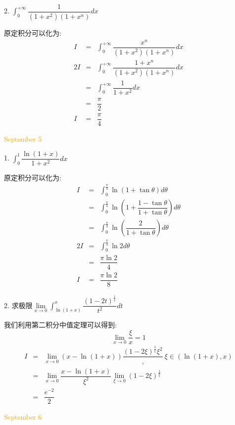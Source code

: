 2. $\int_{0}^{+\infty}\dfrac{1}{(1+x^2)(1+x^n)}dx$
\begin{solution}

	原定积分可以化为:  
	\begin{eqnarray*}
		I&=&\int_{0}^{+\infty}\dfrac{x^n}{(1+x^2)(1+x^n)}dx\\
		2I&=&\int_{0}^{+\infty}\dfrac{1+x^n}{(1+x^2)(1+x^n)}dx\\
		&=&\int_{0}^{+\infty}\dfrac{1}{1+x^2}dx\\
		&=&\dfrac{\pi}{2}\\
		I&=&\dfrac{\pi}{4}
	\end{eqnarray*}
\end{solution}

\textcolor{orange}{September 5}

1. $\int_{0}^{1}\dfrac{\ln(1+x)}{1+x^2}dx$
\begin{solution}

	原定积分可以化为:  
	\begin{eqnarray*}
		I&=&\int_{0}^{\frac{\pi}{4}}\ln(1+\tan \theta)d\theta\\
		&=&\int_{0}^{\frac{\pi}{4}}\ln(1+\dfrac{1-\tan\theta}{1+\tan\theta})d\theta\\
		&=&\int_{0}^{\frac{\pi}{4}}\ln(\dfrac{2}{1+\tan\theta})d\theta\\
		2I&=&\int_{0}^{\frac{\pi}{4}}\ln2d\theta\\
		&=&\dfrac{\pi \ln 2}{4}\\
		I&=&\dfrac{\pi \ln 2}{8}
	\end{eqnarray*}
\end{solution}

2. 求极限$\lim\limits_{x\to 0}\int_{\ln(1+x)}^{x}\dfrac{(1-2t)^{\frac{1}{t}}}{t^2}dt$
\begin{solution}

	我们利用第二积分中值定理可以得到:  
	$$\lim\limits_{x\to 0}\dfrac{\xi}{x}=1$$
	\begin{eqnarray*}
		I&=&\lim\limits_{x\to 0}(x-\ln(1+x))\dfrac{(1-2\xi)^{\frac{1}{\xi}}{\xi^2}},\ \xi\in(\ln(1+x),x)\\
		 &=&\lim\limits_{x\to 0}\dfrac{x-\ln(1+x)}{\xi^2}\lim\limits_{\xi\to 0}(1-2\xi)^{\frac{1}{\xi}}\\
		 &=&\dfrac{e^{-2}}{2}
	\end{eqnarray*}
\end{solution}

\textcolor{orange}{September 6}

